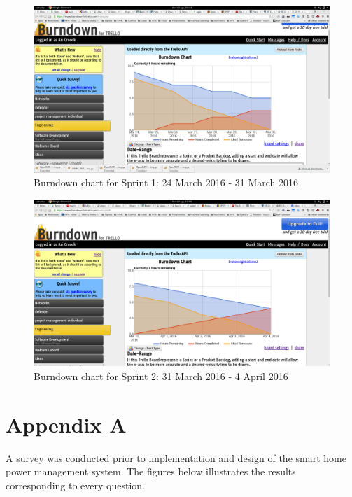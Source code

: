 \documentclass[10pt,twocolumn]{witseiepaper}
\begin{document}
	\begin{figure} [H]
		\centering
		\includegraphics[width=\linewidth]{Burndown1}
		\caption{Burndown chart for Sprint 1: 24 March 2016 - 31 March 2016}
		\label{fig:Burndown1}
	\end{figure}
	
	\begin{figure} [H]
		\centering
		\includegraphics[width=\linewidth]{Burndown2}
		\caption{Burndown chart for Sprint 2: 31 March 2016 - 4 April 2016}
		\label{fig:Burndown2}
	\end{figure}


	
	\newpage
	\pagebreak
	
	
	
	
	\newpage
	\onecolumn
	\section*{Appendix A}
	A survey was conducted prior to implementation and design of the smart home power management system. The figures below illustrates the results corresponding to every question.
	
\end{document}
